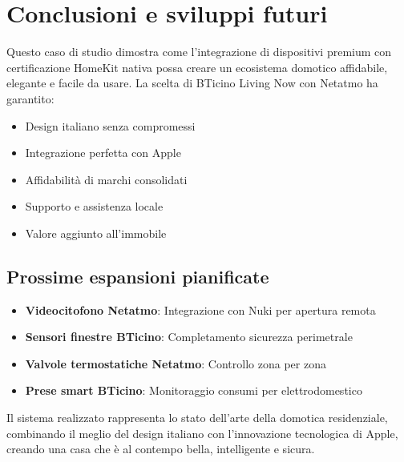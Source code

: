 \section{Conclusioni e sviluppi futuri}

Questo caso di studio dimostra come l'integrazione di dispositivi premium con certificazione HomeKit nativa possa creare un ecosistema domotico affidabile, elegante e facile da usare. La scelta di BTicino Living Now con Netatmo ha garantito:

\begin{itemize}
    \item Design italiano senza compromessi
    \item Integrazione perfetta con Apple
    \item Affidabilità di marchi consolidati
    \item Supporto e assistenza locale
    \item Valore aggiunto all'immobile
\end{itemize}

\subsection{Prossime espansioni pianificate}

\begin{itemize}
    \item \textbf{Videocitofono Netatmo}: Integrazione con Nuki per apertura remota
    \item \textbf{Sensori finestre BTicino}: Completamento sicurezza perimetrale
    \item \textbf{Valvole termostatiche Netatmo}: Controllo zona per zona
    \item \textbf{Prese smart BTicino}: Monitoraggio consumi per elettrodomestico
\end{itemize}

Il sistema realizzato rappresenta lo stato dell'arte della domotica residenziale, combinando il meglio del design italiano con l'innovazione tecnologica di Apple, creando una casa che è al contempo bella, intelligente e sicura.